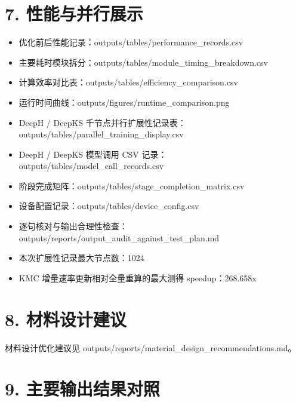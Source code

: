 \documentclass[UTF8,11pt,fontset=none]{ctexart}
\begin{document}
\section*{7. 性能与并行展示}
\begin{itemize}
\item 优化前后性能记录：outputs/tables/performance\_records.csv
\item 主要耗时模块拆分：outputs/tables/module\_timing\_breakdown.csv
\item 计算效率对比表：outputs/tables/efficiency\_comparison.csv
\item 运行时间曲线：outputs/figures/runtime\_comparison.png
\item DeepH / DeepKS 千节点并行扩展性记录表：outputs/tables/parallel\_training\_display.csv
\item DeepH / DeepKS 模型调用 CSV 记录：outputs/tables/model\_call\_records.csv
\item 阶段完成矩阵：outputs/tables/stage\_completion\_matrix.csv
\item 设备配置记录：outputs/tables/device\_config.csv
\item 逐句核对与输出合理性检查：outputs/reports/output\_audit\_against\_test\_plan.md
\item 本次扩展性记录最大节点数：1024
\item KMC 增量速率更新相对全量重算的最大测得 speedup：268.658x
\end{itemize}

\section*{8. 材料设计建议}
材料设计优化建议见 outputs/reports/material\_design\_recommendations.md。

\section*{9. 主要输出结果对照}
\end{document}

